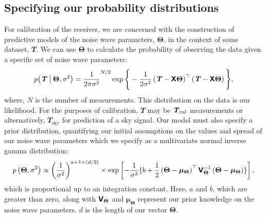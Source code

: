\subsection{Specifying our probability distributions}
\label{sec:likelihood}
For calibration of the receiver, we are concerned with the construction of predictive models of the noise wave parameters, $\boldsymbol{\Theta}$, in the context of some dataset, $\mathbfit{T}$. We can use $\boldsymbol{\Theta}$ to calculate the probability of observing the data given a specific set of noise wave parameters:
\begin{equation}\label{likelihood}
    p\big(\mathbfit{T} \given[\big] \boldsymbol{\Theta}, \sigma^2\big) = \frac{1}{2\pi \sigma^2}^{N/2}\exp{ \Bigg\{ -\frac{1}{2\sigma^2}\left(\mathbfit{T}-\mathbfss{X}\boldsymbol{\Theta}\right)^{\top}\left(\mathbfit{T} -\mathbfss{X}\boldsymbol{\Theta}\right) \Bigg\}},
\end{equation}
where, $N$ is the number of measurements. This distribution on the data is our likelihood. For the purposes of calibration, $\mathbfit{T}$ may be $\y$ measurements or alternatively, $\mathbfit{T}_{\mathrm{sky}}$ for prediction of a sky signal. Our model must also specify a prior distribution, quantifying our initial assumptions on the values and spread of our noise wave parameters which we specify as a multivariate normal inverse gamma distribution:
\begin{equation}
  \label{eqn:prior}
  p\left(\boldsymbol{\Theta}, \sigma^2\right) \propto \left(\frac{1}{\sigma^2}\right)^{a+1+\left(d/2\right)} \times \exp \left[ -\frac{1}{\sigma^2}\{b+\frac{1}{2}\left(\boldsymbol{\Theta}-\boldsymbol{\mu}_{\boldsymbol{\Theta}}\right)^{\top}\mathbfss{V}_{\boldsymbol{\Theta}}^{-1}\left(\boldsymbol{\Theta}-\boldsymbol{\mu}_{\boldsymbol{\Theta}}\right)\} \right],
\end{equation}
which is proportional up to an integration constant. Here, $a$ and $b$, which are greater than zero, along with $\mathbfss{V}_{\boldsymbol{\Theta}}$ and $\boldsymbol{\mu}_{\boldsymbol{\Theta}}$ represent our prior knowledge on the noise wave parameters. $d$ is the length of our vector $\boldsymbol{\Theta}$.

